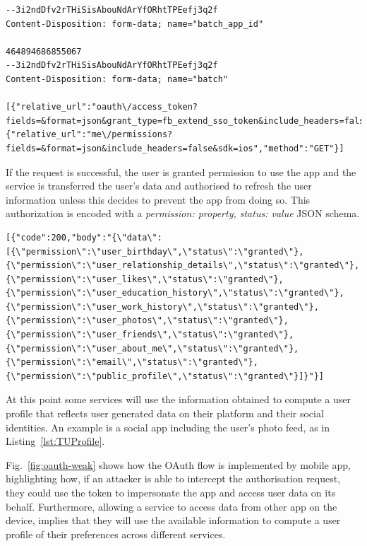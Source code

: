 \begin{lstlisting}
--3i2ndDfv2rTHiSisAbouNdArYfORhtTPEefj3q2f
Content-Disposition: form-data; name="batch_app_id"

464894686855067
--3i2ndDfv2rTHiSisAbouNdArYfORhtTPEefj3q2f
Content-Disposition: form-data; name="batch"

[{"relative_url":"oauth\/access_token?fields=&format=json&grant_type=fb_extend_sso_token&include_headers=false&sdk=ios","method":"GET"},{"relative_url":"me\/permissions?fields=&format=json&include_headers=false&sdk=ios","method":"GET"}]
\end{lstlisting}

If the request is successful, the user is granted permission to use the app and the service is transferred the user's data and authorised to refresh the user information unless this decides to prevent the app from doing so. This authorization is encoded with a \emph{permission: property, status: value} JSON schema. 

\begin{lstlisting}
[{"code":200,"body":"{\"data\":[{\"permission\":\"user_birthday\",\"status\":\"granted\"},{\"permission\":\"user_relationship_details\",\"status\":\"granted\"},{\"permission\":\"user_likes\",\"status\":\"granted\"},{\"permission\":\"user_education_history\",\"status\":\"granted\"},{\"permission\":\"user_work_history\",\"status\":\"granted\"},{\"permission\":\"user_photos\",\"status\":\"granted\"},{\"permission\":\"user_friends\",\"status\":\"granted\"},{\"permission\":\"user_about_me\",\"status\":\"granted\"},{\"permission\":\"email\",\"status\":\"granted\"},{\"permission\":\"public_profile\",\"status\":\"granted\"}]}"}]
\end{lstlisting}

At this point some services will use the information obtained to compute a user profile that reflects user generated data on their platform and their social identities. An example is a social app including the user's photo feed, as in Listing~\ref{lst:TUProfile}.

Fig.~\ref{fig:oauth-weak} shows how the OAuth flow is implemented by mobile app, highlighting how, if an attacker is able to intercept the authorisation request, they could use the token to impersonate the app and access user data on its behalf. Furthermore, allowing a service to access data from other app on the device, implies that they will use the available information to compute a user profile of their preferences across different services.

